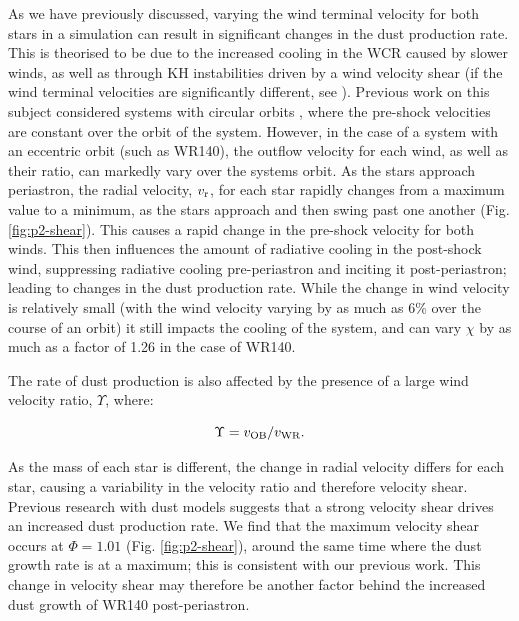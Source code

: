 As we have previously discussed, varying the wind terminal velocity for both stars in a simulation can result in significant changes in the dust production rate.
This is theorised to be due to the increased cooling in the WCR caused by slower winds, as well as through KH instabilities driven by a wind velocity shear (if the wind terminal velocities are significantly different, see \cite{stevens_colliding_1992}).
Previous work on this subject considered systems with circular orbits \parencite{eatsonExplorationDustGrain2022}, where the pre-shock velocities are constant over the orbit of the system.
However, in the case of a system with an eccentric orbit (such as WR140), the outflow velocity for each wind, as well as their ratio, can markedly vary over the systems orbit.
As the stars approach periastron, the radial velocity, $v_\text{r}$, for each star rapidly changes from a maximum value to a minimum, as the stars approach and then swing past one another (Fig. \ref{fig:p2-shear}).
This causes a rapid change in the pre-shock velocity for both winds.
This then influences the amount of radiative cooling in the post-shock wind, suppressing radiative cooling pre-periastron and inciting it post-periastron; leading to changes in the dust production rate. 
While the change in wind velocity is relatively small (with the wind velocity varying by as much as 6\% over the course of an orbit) it still impacts the cooling of the system, and can vary $\chi$ by as much as a factor of 1.26 in the case of WR140.

The rate of dust production is also affected by the presence of a large wind velocity ratio, $\Upsilon$, where:

\begin{equation}
  \Upsilon = v_\text{OB} / v_\text{WR} .
\end{equation}

\noindent
As the mass of each star is different, the change in radial velocity differs for each star, causing a variability in the velocity ratio and therefore velocity shear.
Previous research with dust models suggests that a strong velocity shear drives an increased dust production rate.
We find that the maximum velocity shear occurs at $\Phi = 1.01$ (Fig. \ref{fig:p2-shear}), around the same time where the dust growth rate is at a maximum; this is consistent with our previous work.
This change in velocity shear may therefore be another factor behind the increased dust growth of WR140 post-periastron.

